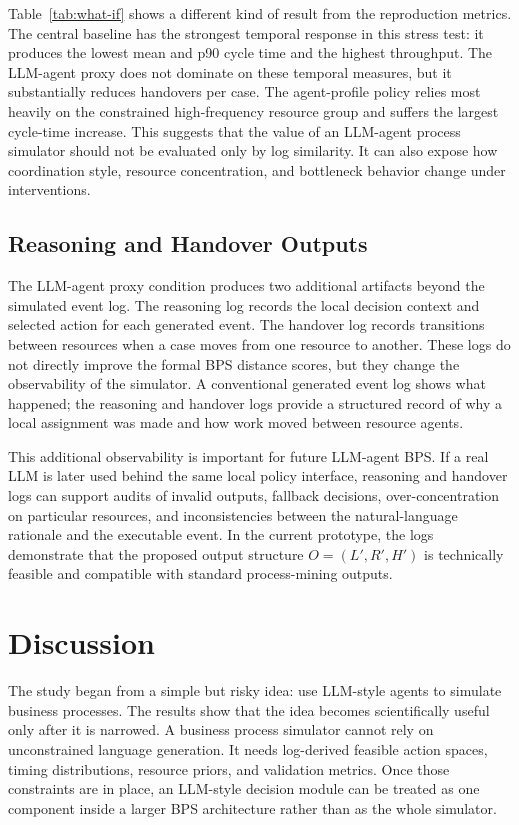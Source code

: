 Table~\ref{tab:what-if} shows a different kind of result from the
reproduction metrics. The central baseline has the strongest temporal
response in this stress test: it produces the lowest mean and p90 cycle
time and the highest throughput. The LLM-agent proxy does not dominate
on these temporal measures, but it substantially reduces handovers per
case. The agent-profile policy relies most heavily on the constrained
high-frequency resource group and suffers the largest cycle-time
increase. This suggests that the value of an LLM-agent process simulator
should not be evaluated only by log similarity. It can also expose how
coordination style, resource concentration, and bottleneck behavior
change under interventions.

\subsection{Reasoning and Handover
Outputs}\label{reasoning-and-handover-outputs}

The LLM-agent proxy condition produces two additional artifacts beyond
the simulated event log. The reasoning log records the local decision
context and selected action for each generated event. The handover log
records transitions between resources when a case moves from one
resource to another. These logs do not directly improve the formal BPS
distance scores, but they change the observability of the simulator. A
conventional generated event log shows what happened; the reasoning and
handover logs provide a structured record of why a local assignment was
made and how work moved between resource agents.

This additional observability is important for future LLM-agent BPS. If
a real LLM is later used behind the same local policy interface,
reasoning and handover logs can support audits of invalid outputs,
fallback decisions, over-concentration on particular resources, and
inconsistencies between the natural-language rationale and the
executable event. In the current prototype, the logs demonstrate that
the proposed output structure \(O=(L', R', H')\) is technically feasible
and compatible with standard process-mining outputs.

\section{Discussion}\label{discussion}

The study began from a simple but risky idea: use LLM-style agents to
simulate business processes. The results show that the idea becomes
scientifically useful only after it is narrowed. A business process
simulator cannot rely on unconstrained language generation. It needs
log-derived feasible action spaces, timing distributions, resource
priors, and validation metrics. Once those constraints are in place, an
LLM-style decision module can be treated as one component inside a
larger BPS architecture rather than as the whole simulator.

